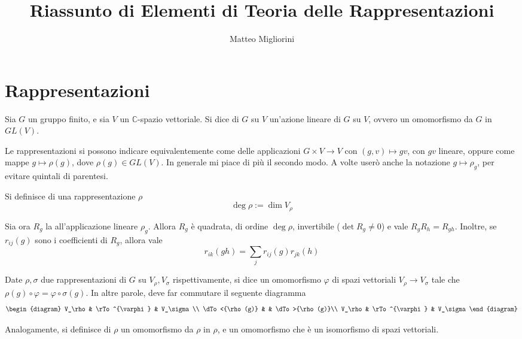 \documentclass[a4paper,10pt,oneside]{math_article}
\title{Riassunto di Elementi di Teoria delle Rappresentazioni}
\author{Matteo Migliorini}
\date{}
\renewcommand{\phi}{\varphi}
\begin{document}
 
 
 \maketitle
 
 \cleardoublepage	
 \tableofcontents
 \cleardoublepage
 
  \section{Rappresentazioni}
    \begin{mydef}
      Sia $G$ un gruppo finito, e sia $V$ un $\mathbb C$-spazio vettoriale. Si dice  di $G$ su $V$ un'azione lineare di $G$ su $V$, ovvero un omomorfismo da $G$ in $GL(V)$.
    \end{mydef}
    
    Le rappresentazioni si possono indicare equivalentemente come delle applicazioni $G \times V \rightarrow V$ con $(g,v)\mapsto gv$, con $gv$ lineare, oppure come mappe $g \mapsto \rho(g)$, dove $\rho(g) \in GL(V)$. In generale mi piace di più il secondo modo. A volte userò anche la notazione $g \mapsto \rho_g$, per evitare quintali di parentesi.
    
    \begin{mydef}
     Si definisce  di una rappresentazione $\rho$
     \[\deg \rho := \dim V_\rho\]
    \end{mydef}

    
    Sia ora $R_g$ la  all'applicazione lineare $\rho_g$. Allora $R_g$ è quadrata, di ordine $\deg \rho$, invertibile ($\det R_g \ne 0$) e vale $R_g R_h=R_{gh}$. Inoltre, se $r_{ij}(g)$ sono i coefficienti di $R_g$, allora vale
    \[
     r_{ik}(gh)=\sum_j r_{ij}(g)r_{jk}(h)
    \]

    
    \begin{mydef}
      Date $\rho,\sigma$ due rappresentazioni di $G$ su $V_\rho,V_\sigma$ rispettivamente, si dice  un omomorfismo $\phi$ di spazi vettoriali $V_\rho \rightarrow V_\sigma$ tale che $\rho(g) \circ \phi = \phi \circ \sigma(g)$. 
      In altre parole, deve far commutare il seguente diagramma
      \[
       \begin{diagram}
	V_\rho         & \rTo^{\phi}  & V_\sigma\\
	\dTo<{\rho(g)} &           	 & \dTo>{\rho(g)}\\
	V_\rho         & \rTo^{\phi}  & V_\sigma
       \end{diagram}
      \]
       
    Analogamente, si definisce  di $\rho$ un omomorfismo da $\rho$ in $\rho$, e  un omomorfismo che è un isomorfismo di spazi vettoriali.
    \end{mydef}
    
\end{document}
